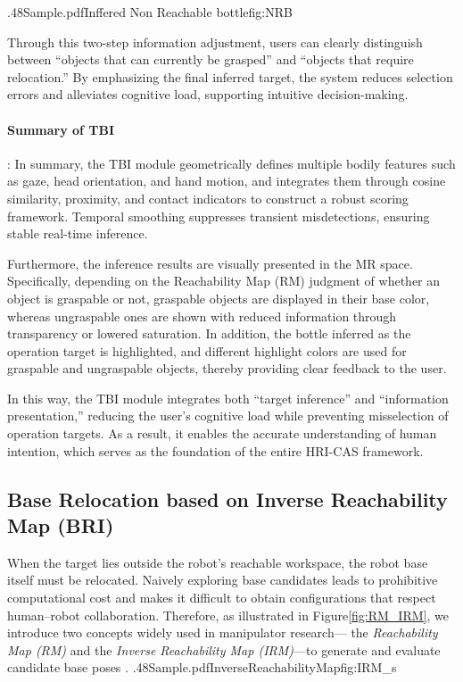 \documentclass[../../main.tex]{subfiles} %
\begin{document}
{.48\linewidth}{Sample.pdf}{Inffered Non Reachable bottle}{fig:NRB}
\label{fig5}

Through this two-step information adjustment,  
users can clearly distinguish between “objects that can currently be grasped” 
and “objects that require relocation.”  
By emphasizing the final inferred target,  
the system reduces selection errors and alleviates cognitive load,  
supporting intuitive decision-making.

\paragraph{Summary of TBI}:  
In summary, the TBI module geometrically defines multiple bodily features 
such as gaze, head orientation, and hand motion,  
and integrates them through cosine similarity, proximity, and contact indicators 
to construct a robust scoring framework.  
Temporal smoothing suppresses transient misdetections, ensuring stable real-time inference.  

Furthermore, the inference results are visually presented in the MR space. 
Specifically, depending on the Reachability Map (RM) judgment of whether 
an object is graspable or not, graspable objects are displayed in their base color, 
whereas ungraspable ones are shown with reduced information through transparency 
or lowered saturation. In addition, the bottle inferred as the operation 
target is highlighted, and different highlight colors are used for graspable 
and ungraspable objects, thereby providing clear feedback to the user.

In this way, the TBI module integrates both “target inference” and 
“information presentation,” reducing the user’s cognitive load while 
preventing misselection of operation targets. As a result, it enables 
the accurate understanding of human intention, which serves as the 
foundation of the entire HRI-CAS framework.



\subsection{Base Relocation based on Inverse Reachability Map (BRI)}

When the target lies outside the robot’s reachable workspace, the robot base 
itself must be relocated.  
Naively exploring base candidates leads to prohibitive computational cost and 
makes it difficult 
to obtain configurations that respect human–robot collaboration.  
Therefore, as illustrated in Figure\ref{fig:RM_IRM}, 
we introduce two concepts widely used in manipulator research— the \textit{Reachability Map (RM)} and
the \textit{Inverse Reachability Map (IRM)}—to generate and evaluate candidate base poses \cite{RM}. 
{.48\linewidth}{Sample.pdf}{InverseReachabilityMap}{fig:IRM_s}
\label{fig:RM_IRM}
\end{document}
